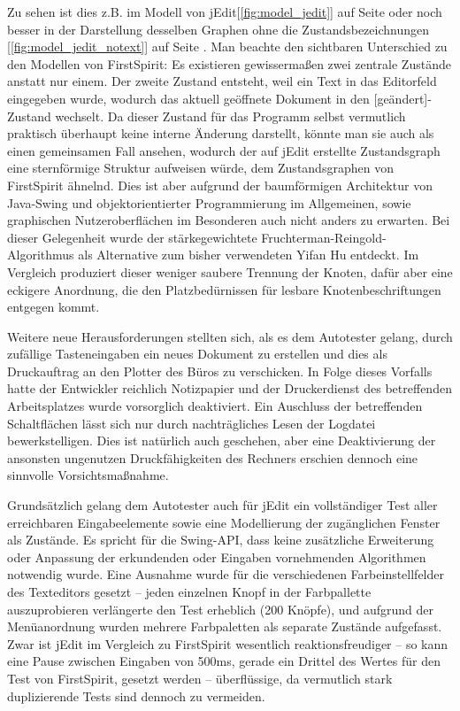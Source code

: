 Zu sehen ist dies z.B. im Modell von jEdit[\ref{fig:model_jedit}]
auf Seite \pageref{fig:model_jedit} oder noch besser in der Darstellung
desselben Graphen ohne die Zustandsbezeichnungen
[\ref{fig:model_jedit_notext}] auf Seite \pageref{fig:model_jedit_notext}.
Man beachte den sichtbaren Unterschied zu den Modellen von FirstSpirit:
Es existieren gewissermaßen zwei zentrale Zustände anstatt nur einem.
Der zweite Zustand entsteht, weil ein Text in das Editorfeld eingegeben
wurde, wodurch das aktuell geöffnete Dokument in den
\glqq{}[geändert]\grqq{}-Zustand wechselt. Da dieser Zustand
für das Programm selbst vermutlich praktisch überhaupt keine
interne Änderung darstellt, könnte man sie auch als einen 
gemeinsamen Fall ansehen, wodurch der auf jEdit erstellte 
Zustandsgraph eine sternförmige Struktur
aufweisen würde, dem Zustandsgraphen von FirstSpirit ähnelnd.
Dies ist aber aufgrund der baumförmigen
Architektur von Java-Swing und objektorientierter Programmierung
im Allgemeinen, sowie graphischen Nutzeroberflächen im Besonderen
auch nicht anders zu erwarten. Bei dieser Gelegenheit wurde
der stärkegewichtete 
Fruchterman-Reingold-Algorithmus\cite{SPE:SPE4380211102}
als Alternative zum bisher verwendeten Yifan Hu\cite{hu2005efficient}
entdeckt. Im Vergleich produziert dieser weniger saubere Trennung
der Knoten, dafür aber eine eckigere Anordnung, die den 
Platzbedürnissen für lesbare Knotenbeschriftungen entgegen kommt.

Weitere neue Herausforderungen stellten sich, als es dem
Autotester gelang, durch zufällige Tasteneingaben ein neues 
Dokument zu erstellen und dies als Druckauftrag 
an den Plotter des Büros zu verschicken. In Folge dieses Vorfalls
hatte der Entwickler reichlich Notizpapier und der Druckerdienst
des betreffenden Arbeitsplatzes wurde vorsorglich deaktiviert.
Ein Auschluss der betreffenden Schaltflächen lässt sich
nur durch nachträgliches Lesen der Logdatei bewerkstelligen.
Dies ist natürlich auch geschehen, aber eine Deaktivierung
der ansonsten ungenutzen Druckfähigkeiten des Rechners
erschien dennoch eine sinnvolle Vorsichtsmaßnahme.

Grundsätzlich gelang dem Autotester auch für jEdit ein
vollständiger Test aller erreichbaren Eingabeelemente
sowie eine Modellierung der zugänglichen Fenster als
Zustände. Es spricht für die Swing-API, dass keine
zusätzliche Erweiterung oder Anpassung der erkundenden
oder Eingaben vornehmenden Algorithmen notwendig wurde.
Eine Ausnahme wurde für die verschiedenen Farbeinstellfelder
des Texteditors gesetzt -- jeden einzelnen Knopf in der Farbpallette
auszuprobieren verlängerte den Test erheblich (200 Knöpfe),
und aufgrund der Menüanordnung wurden mehrere Farbpaletten
als separate Zustände aufgefasst. Zwar ist jEdit im Vergleich
zu FirstSpirit wesentlich reaktionsfreudiger -- so kann eine
Pause zwischen Eingaben von 500ms, gerade ein Drittel
des Wertes für den Test von FirstSpirit, gesetzt werden --
überflüssige, da vermutlich stark duplizierende Tests
sind dennoch zu vermeiden.


